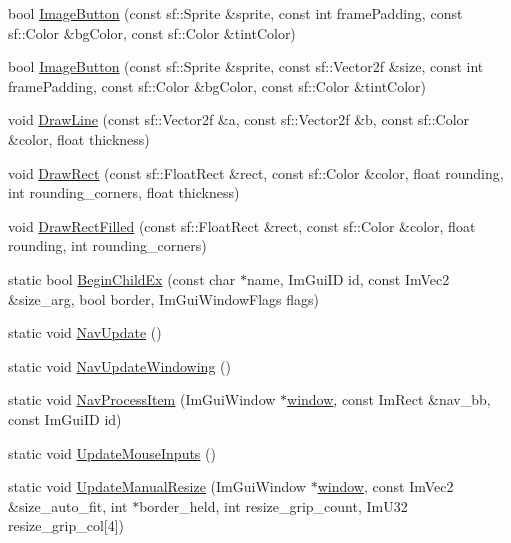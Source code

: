 \begin{DoxyCompactItemize}
\item 
bool \mbox{\hyperlink{namespace_im_gui_ae1ea307f7616cf2143040c02f40d676a}{Image\+Button}} (const sf\+::\+Sprite \&sprite, const int frame\+Padding, const sf\+::\+Color \&bg\+Color, const sf\+::\+Color \&tint\+Color)
\item 
bool \mbox{\hyperlink{namespace_im_gui_a37ef3e433d07343a693fde368fe68608}{Image\+Button}} (const sf\+::\+Sprite \&sprite, const sf\+::\+Vector2f \&size, const int frame\+Padding, const sf\+::\+Color \&bg\+Color, const sf\+::\+Color \&tint\+Color)
\item 
void \mbox{\hyperlink{namespace_im_gui_a9755035852a0a56e278947806b1ebed1}{Draw\+Line}} (const sf\+::\+Vector2f \&a, const sf\+::\+Vector2f \&b, const sf\+::\+Color \&color, float thickness)
\item 
void \mbox{\hyperlink{namespace_im_gui_abc7adec78c245a8f121051962d7dd434}{Draw\+Rect}} (const sf\+::\+Float\+Rect \&rect, const sf\+::\+Color \&color, float rounding, int rounding\+\_\+corners, float thickness)
\item 
void \mbox{\hyperlink{namespace_im_gui_a546d66f8477ae03b435b549891729701}{Draw\+Rect\+Filled}} (const sf\+::\+Float\+Rect \&rect, const sf\+::\+Color \&color, float rounding, int rounding\+\_\+corners)
\item 
static bool \mbox{\hyperlink{namespace_im_gui_a2859716218e80788a82e6f76c5cf19b9}{Begin\+Child\+Ex}} (const char $\ast$name, Im\+Gui\+ID id, const Im\+Vec2 \&size\+\_\+arg, bool border, Im\+Gui\+Window\+Flags flags)
\item 
static void \mbox{\hyperlink{namespace_im_gui_aab7d3ffa460af6604421e8c2d8bdef19}{Nav\+Update}} ()
\item 
static void \mbox{\hyperlink{namespace_im_gui_ad00213b916de0bc1519d6d20259391cf}{Nav\+Update\+Windowing}} ()
\item 
static void \mbox{\hyperlink{namespace_im_gui_a294f4417f6a5aa0b6528a4d70f8922a7}{Nav\+Process\+Item}} (Im\+Gui\+Window $\ast$\mbox{\hyperlink{_globals_8cpp_ae227837337adb8c62b56e2930ad81cda}{window}}, const Im\+Rect \&nav\+\_\+bb, const Im\+Gui\+ID id)
\item 
static void \mbox{\hyperlink{namespace_im_gui_accb45e7a4174fdc2e0d2b662c834759d}{Update\+Mouse\+Inputs}} ()
\item 
static void \mbox{\hyperlink{namespace_im_gui_a47e299647fc918d97e3085272493bd13}{Update\+Manual\+Resize}} (Im\+Gui\+Window $\ast$\mbox{\hyperlink{_globals_8cpp_ae227837337adb8c62b56e2930ad81cda}{window}}, const Im\+Vec2 \&size\+\_\+auto\+\_\+fit, int $\ast$border\+\_\+held, int resize\+\_\+grip\+\_\+count, Im\+U32 resize\+\_\+grip\+\_\+col\mbox{[}4\mbox{]})

\end{DoxyCompactItemize}
